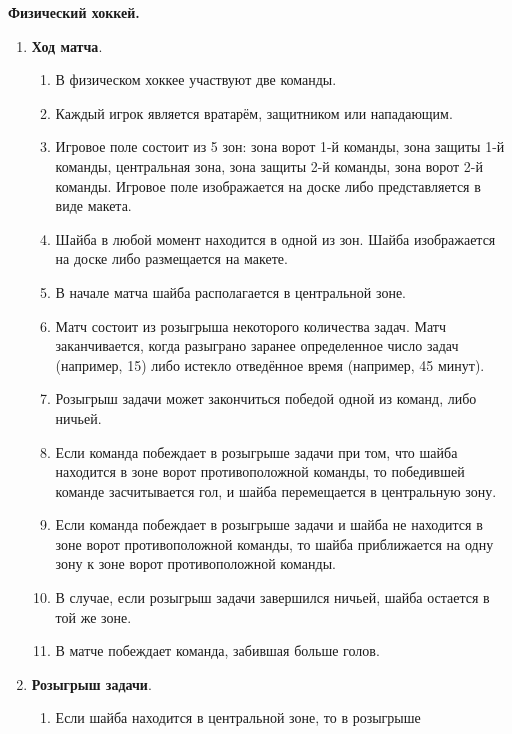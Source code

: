 \documentclass[11pt]{article}
\begin{document}
\begin{center}
  \Large{\textbf{Физический хоккей.}}
\end{center}



\begin{enumerate}[label*=\arabic*.]
  \setlength{\itemsep}{-1mm}
  \item \textbf{Ход матча}. 
  \begin{enumerate}[label*=\arabic*.]
  \item В физическом хоккее участвуют две команды.
  \item Каждый игрок является вратарём, защитником или нападающим.
  \item Игровое поле состоит из 5 зон: зона ворот 1-й команды, зона
    защиты 1-й команды, центральная зона, зона защиты 2-й команды,
    зона ворот 2-й команды. Игровое поле изображается на доске либо
    представляется в виде макета.
  \item Шайба в любой момент находится в одной из зон. Шайба
    изображается на доске либо размещается на макете.
  \item В начале матча шайба располагается в центральной зоне.
  \item Матч состоит из розыгрыша некоторого количества задач. Матч
    заканчивается, когда разыграно заранее определенное число задач
    (например, 15) либо истекло отведённое время (например, 45 минут).
  \item Розыгрыш задачи может закончиться победой одной из команд,
    либо ничьей.
  \item Если команда побеждает в розыгрыше задачи при том, что шайба
    находится в зоне ворот противоположной команды, то победившей
    команде засчитывается гол, и шайба перемещается в центральную
    зону.
  \item Если команда побеждает в розыгрыше задачи и шайба не находится
    в зоне ворот противоположной команды, то шайба приближается на
    одну зону к зоне ворот противоположной команды.
  \item В случае, если розыгрыш задачи завершился ничьей, шайба
    остается в той же зоне.
  \item В матче побеждает команда, забившая больше голов.
  \end{enumerate}
  \item \textbf{Розыгрыш задачи}.
    \begin{enumerate}[label*=\arabic*.]
    \item Если шайба находится в центральной зоне, то в розыгрыше

\end{enumerate}
\end{enumerate}
\end{document}
